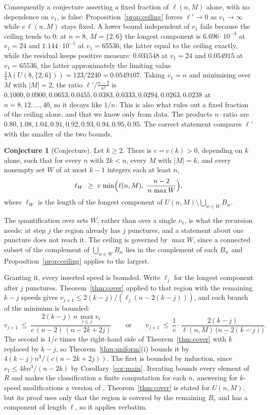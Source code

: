 \documentclass[11pt]{amsart}
\theoremstyle{plain}
\theoremstyle{definition}
\newtheorem{conjecture}[theorem]{Conjecture}
\begin{document}
Consequently a conjecture asserting a fixed fraction of $\ell(n,M)$ alone, with no dependence on
$v_1$, is false: Proposition~\ref{prop:ceiling} forces $\ell'\to0$ as $v_1\to\infty$ while
$c\,\ell(n,M)$ stays fixed. A lower
bound independent of $v_1$ fails because the ceiling tends to $0$: at $n=8$, $M=\{2,6\}$ the longest
component is $6.696\cdot10^{-3}$ at $v_1=24$ and $1.144\cdot10^{-5}$ at $v_1=65536$, the latter
equal to the ceiling exactly, while the residual keeps positive measure: $0.031548$ at $v_1=24$ and
$0.054915$ at $v_1=65536$, the latter approximately the limiting value $\tfrac34\lambda(U(8,\{2,6\}))=123/2240=0.0549107$. Taking $v_1=n$ and minimising over $M$ with $|M|=2$, the ratio
$\ell'\big/\frac{n-2}{n^{2}}$ is $0.1000,0.0900,0.0653,0.0455,0.0383,0.0333,0.0294,0.0263,0.0238$ at
$n=8,12,\dots,40$, so it decays like $1/n$. This is also what rules out a fixed fraction of the
ceiling alone, and that we know only from data. The products $n\cdot\text{ratio}$ are
$0.80,1.08,1.04,0.91,0.92,0.93,0.94,0.95,0.95$. The correct statement compares $\ell'$ with the smaller of
the two bounds.

\begin{conjecture}[Conjecture]\label{conj:resid}
Let $k\ge2$. There is $c=c(k)>0$, depending on $k$ alone, such that for every $n$ with $2k<n$, every
$M$ with $|M|=k$, and every nonempty set $W$ of at most $k-1$ integers each at least $n$,
\[
  \ell_W\ \ge\ c\,\min\Bigl(\ell(n,M),\ \frac{n-2}{n\,\max W}\Bigr),
\]
where $\ell_W$ is the length of the longest component of
$U(n,M)\setminus\bigcup_{w\in W}B_w$.
\end{conjecture}

The quantification over sets $W$, rather than over a single $v_1$, is what the recursion needs: at
step $j$ the region already has $j$ punctures, and a statement about one puncture does not reach it.
The ceiling is governed by $\max W$, since a connected subset of the complement of
$\bigcup_{w\in W}B_w$ lies in the complement of each $B_w$ and Proposition~\ref{prop:ceiling} applies
to the largest.

Granting it, every inserted speed is bounded. Write $\ell_j$ for the longest component after $j$
punctures. Theorem~\ref{thm:cover} applied to that region with the remaining $k-j$ speeds gives
$v_{j+1}\le 2(k-j)/(\ell_j(n-2(k-j)))$, and each branch of the minimum is bounded:
\[
  v_{j+1}\ \le\ \frac{2(k-j)\,n\,\max_{i\le j}v_i}{c\,(n-2)\,(n-2k+2j)}
  \qquad\text{or}\qquad
  v_{j+1}\ \le\ \frac1c\cdot\frac{2(k-j)}{\ell(n,M)\,\bigl(n-2(k-j)\bigr)} .
\]
The second is $1/c$ times the right-hand side of Theorem~\ref{thm:cover} with $k$ replaced by $k-j$,
so Theorem~\ref{thm:uniform}(i) bounds it by $4(k-j)n^{3}/(c(n-2k+2j))$. The first is bounded by
induction, since $v_1\le 4kn^{3}/(n-2k)$ by Corollary~\ref{cor:main}. Iterating bounds every element
of $R$ and makes the classification a finite computation for each $n$, answering for $k$-speed
modifications a version of \cite[Question~9.3]{zhang}. Theorem~\ref{thm:cover} is stated for
$U(n,M)$, but its proof uses only that the region is covered by the remaining $B_v$ and has a
component of length $\ell$, so it applies verbatim.
\end{document}
